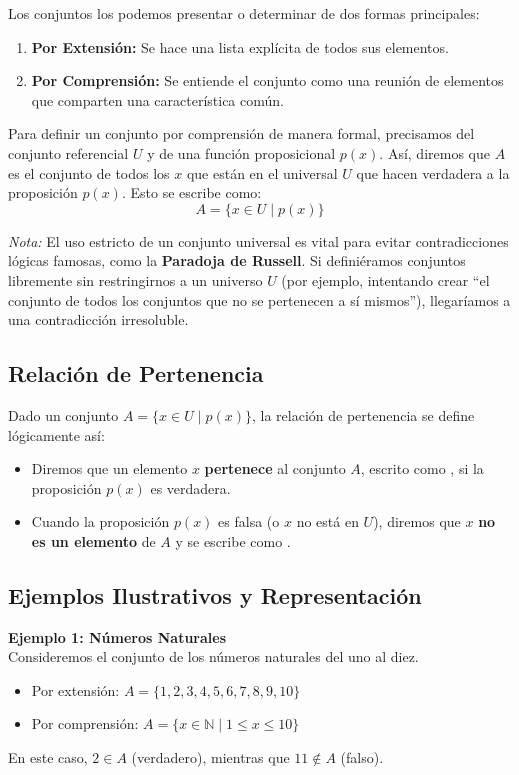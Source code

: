 Los conjuntos los podemos presentar o determinar de dos formas principales:

\begin{enumerate}
    \item \textbf{Por Extensión:} Se hace una lista explícita de todos sus elementos.
    \item \textbf{Por Comprensión:} Se entiende el conjunto como una reunión de elementos que comparten una característica común. 
\end{enumerate}

Para definir un conjunto por comprensión de manera formal, precisamos del conjunto referencial $U$ y de una función proposicional $p(x)$. Así, diremos que $A$ es el conjunto de todos los $x$ que están en el universal $U$ que hacen verdadera a la proposición $p(x)$. Esto se escribe como:
\[ A =\{x\in U \mid p(x)\} \]

\footnotesize
\noindent \textit{Nota:} El uso estricto de un conjunto universal es vital para evitar contradicciones lógicas famosas, como la \textbf{Paradoja de Russell}. Si definiéramos conjuntos libremente sin restringirnos a un universo $U$ (por ejemplo, intentando crear ``el conjunto de todos los conjuntos que no se pertenecen a sí mismos''), llegaríamos a una contradicción irresoluble.
\normalsize

\subsection{Relación de Pertenencia}

Dado un conjunto $A = \{x\in U \mid p(x)\}$, la relación de pertenencia se define lógicamente así:

\begin{itemize}
    \item Diremos que un elemento $x$ \textbf{pertenece} al conjunto $A$, escrito como , si la proposición $p(x)$ es verdadera.
    \item Cuando la proposición $p(x)$ es falsa (o $x$ no está en $U$), diremos que $x$ \textbf{no es un elemento} de $A$ y se escribe como .
\end{itemize}

\subsection{Ejemplos Ilustrativos y Representación}

\noindent \textbf{Ejemplo 1: Números Naturales} \\
Consideremos el conjunto de los números naturales del uno al diez.
\begin{itemize}
    \item Por extensión: $A=\{1,2,3,4,5,6,7,8,9,10\}$
    \item Por comprensión: $A = \{ x \in \mathbb{N} \mid 1 \le x \le 10 \}$
\end{itemize}
En este caso, $2 \in A$ (verdadero), mientras que $11 \notin A$ (falso).

